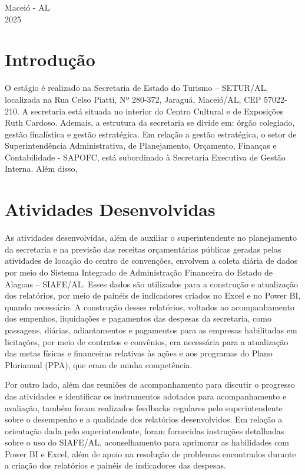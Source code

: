 \documentclass[12pt,a4paper]{article}
\begin{document}
	\vfill
	\begin{flushright}
		\centering Maceió - AL \\
		2025
	\end{flushright}
	
	\newpage
	
	\section{Introdução}
	\hspace*{1,5cm} O estágio é realizado na Secretaria de Estado do Turismo – SETUR/AL, localizada na
	Rua Celso Piatti, Nº 280-372, Jaraguá, Maceió/AL, CEP 57022-210. A secretaria está situada
	no interior do Centro Cultural e de Exposições Ruth Cardoso. Ademais, a estrutura da secretaria
	se divide em: órgão colegiado, gestão finalística e gestão estratégica. Em relação a gestão
	estratégica, o setor de Superintendência Administrativa, de Planejamento, Orçamento, Finanças
	e Contabilidade - SAPOFC, está subordinado à Secretaria Executiva de Gestão Interna. Além disso,
	
	\hspace*{1,5cm}
	
	\section{Atividades Desenvolvidas}
	


	\hspace*{1,5cm} As atividades desenvolvidas, além de auxiliar o superintendente no planejamento da secretaria e 
	na previsão das receitas orçamentárias públicas geradas pelas atividades de locação do centro de convenções, 
	envolvem a coleta diária de dados por meio do Sistema Integrado de Administração Financeira do Estado de Alagoas – SIAFE/AL. 
	Esses dados são utilizados para a construção e atualização dos relatórios, por meio de painéis de indicadores criados no Excel e no Power BI, 
	quando necessário. A construção desses relatórios, voltados ao acompanhamento dos empenhos, liquidações e 
	pagamentos das despesas da secretaria, como passagens, diárias, adiantamentos e pagamentos para as empresas
	habilitadas em licitações, por meio de contratos e convênios, era necessária para a atualização das metas 
 	físicas e financeiras relativas às ações e aos programas do Plano Plurianual (PPA), que eram de minha competência.  
	
	Por outro lado, além das reuniões de acompanhamento para discutir o progresso das atividades
	e identificar os instrumentos adotados para acompanhamento e avaliação, também foram realizados 
	feedbacks regulares pelo superintendente sobre o desempenho e a qualidade dos relatórios desenvolvidos. 
	Em relação a orientação dada pelo superintendente, foram fornecidas instruções detalhadas sobre o uso do SIAFE/AL, 
	aconselhamento para aprimorar as habilidades com Power BI e Excel, além de apoio na 
	resolução de problemas encontrados durante a criação dos relatórios e painéis de indicadores das despesas.  
 	
\end{document}
